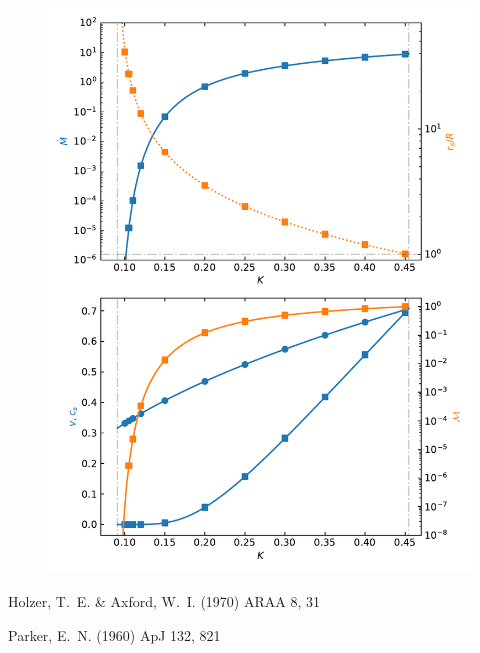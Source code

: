 \documentclass[preprint,12pt]{aastex}
\begin{document}
\begin{figure}
\begin{center}
	\includegraphics[width=13.5cm]{plot_gam11.pdf}
\end{center}
\end{figure}



\begin{references}

\noindent
Holzer, T.~E. \& Axford, W.~I. (1970) ARAA 8, 31

\noindent
Parker, E.~N. (1960) ApJ 132, 821


\end{references}
\end{document}
